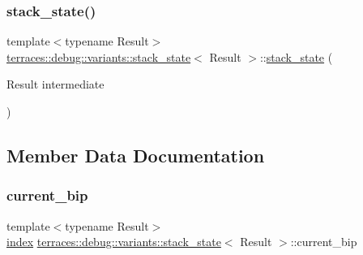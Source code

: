 \subsubsection{\texorpdfstring{stack\+\_\+state()}{stack\_state()}}
{\footnotesize\ttfamily template$<$typename Result$>$ \\
\hyperlink{structterraces_1_1debug_1_1variants_1_1stack__state}{terraces\+::debug\+::variants\+::stack\+\_\+state}$<$ Result $>$\+::\hyperlink{structterraces_1_1debug_1_1variants_1_1stack__state}{stack\+\_\+state} (\begin{DoxyParamCaption}\item[{Result}]{intermediate }\end{DoxyParamCaption})\hspace{0.3cm}{\ttfamily [inline]}}



\subsection{Member Data Documentation}
\mbox{\label{structterraces_1_1debug_1_1variants_1_1stack__state_a99c9586ee3fc9e182d85d5c9bec85175}} 
\subsubsection{\texorpdfstring{current\+\_\+bip}{current\_bip}}
{\footnotesize\ttfamily template$<$typename Result$>$ \\
\hyperlink{namespaceterraces_adbc33ccb543d1634e96d0eb02e472c77}{index} \hyperlink{structterraces_1_1debug_1_1variants_1_1stack__state}{terraces\+::debug\+::variants\+::stack\+\_\+state}$<$ Result $>$\+::current\+\_\+bip}

\mbox{\label{structterraces_1_1debug_1_1variants_1_1stack__state_a808ad42bf719be610fb8b85c426858a1}} 
